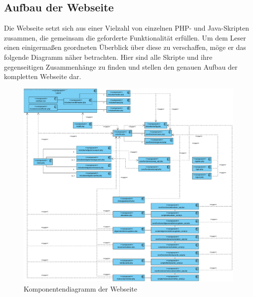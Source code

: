 \documentclass[fontsize = 12pt, paper = a4]{scrreprt}
\begin{document}

\subsection{Aufbau der Webseite}
Die Webseite setzt sich aus einer Vielzahl von einzelnen PHP- und Java-Skripten zusammen, die gemeinsam die geforderte Funktionalität erfüllen. Um dem Leser einen einigermaßen geordneten Überblick über diese zu verschaffen, möge er das folgende Diagramm näher betrachten. Hier sind alle Skripte und ihre gegenseitigen Zusammenhänge zu finden und stellen den genauen Aufbau der kompletten Webseite dar.

\begin{figure}[h]
\centering
\includegraphics[scale = 0.4]{webseite}
\caption[Komponentendiagramm der Webseite]{Komponentendiagramm der Webseite}
\label{aufbau}
\end{figure}
\end{document}
